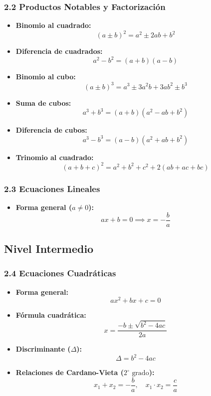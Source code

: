 \documentclass[11pt,a4paper]{article}
\begin{document}
\subsubsection*{2.2 Productos Notables y Factorización}

\begin{itemize}
  \item \textbf{Binomio al cuadrado:}
  \[
    (a \pm b)^2 = a^2 \pm 2ab + b^2
  \]
  \item \textbf{Diferencia de cuadrados:}
  \[
    a^2 - b^2 = (a + b)(a - b)
  \]
  \item \textbf{Binomio al cubo:}
  \[
    (a \pm b)^3 = a^3 \pm 3a^2b + 3ab^2 \pm b^3
  \]
  \item \textbf{Suma de cubos:}
  \[
    a^3 + b^3 = (a + b)(a^2 - ab + b^2)
  \]
  \item \textbf{Diferencia de cubos:}
  \[
    a^3 - b^3 = (a - b)(a^2 + ab + b^2)
  \]
  \item \textbf{Trinomio al cuadrado:}
  \[
    (a + b + c)^2 = a^2 + b^2 + c^2 + 2(ab + ac + bc)
  \]
\end{itemize}

\subsubsection*{2.3 Ecuaciones Lineales}

\begin{itemize}
  \item \textbf{Forma general ($a \ne 0$):}
  \[
    ax + b = 0 \implies x = -\frac{b}{a}
  \]
\end{itemize}

\subsection*{Nivel Intermedio}

\subsubsection*{2.4 Ecuaciones Cuadráticas}

\begin{itemize}
  \item \textbf{Forma general:}
  \[
    ax^2 + bx + c = 0
  \]
  \item \textbf{Fórmula cuadrática:}
  \[
    x = \frac{-b \pm \sqrt{b^2 - 4ac}}{2a}
  \]
  \item \textbf{Discriminante ($\Delta$):}
  \[
    \Delta = b^2 - 4ac
  \]
  \item \textbf{Relaciones de Cardano-Vieta ($2^\circ \text{ grado}$):}
  \[
    x_1 + x_2 = -\frac{b}{a}, \quad x_1 \cdot x_2 = \frac{c}{a}
  \]
\end{itemize}
\end{document}
